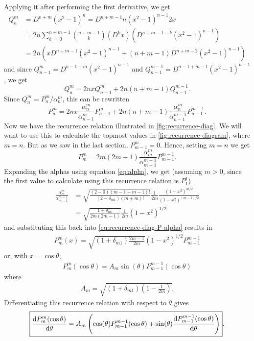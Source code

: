 \documentclass[12pt]{article}
\begin{document}
Applying it after performing the first derivative, we get
\begin{align}
  Q_n^m &= D^{n+m}(x^2 - 1)^n = D^{n + m - 1}n(x^2 - 1)^{n-1}2x\\ 
  &= 2n\sum_{k\,=\,0}^{n+m-1}{n+m-1\choose k}\left(D^k x\right)\left(D^{n+m-1-k}(x^2 - 1)^{n-1}\right)\\ 
  &= 2n\left(xD^{n+m-1}(x^2 - 1)^{n-1} + (n+m-1)D^{n+m-2}(x^2-1)^{n-1}\right)
\end{align}
and since $Q_{n-1}^{m} = D^{n-1+m}(x^2-1)^{n-1}$ and $Q_{n-1}^{m-1}=D^{n-1+m-1}(x^2-1)^{n-1}$, we get
\begin{equation}\label{eq:recurrence-diag-Q}
  Q_n^m = 2nxQ_{n-1}^m + 2n(n+m-1)Q_{n-1}^{m-1}.
\end{equation}
Since $Q_n^m=P_n^m/\alpha_n^m$, this can be rewritten
\begin{equation}
  P_n^m = 2nx\frac{\alpha_n^m}{\alpha_{n-1}^m}P_{n-1}^m + 2n(n+m-1)\frac{\alpha_n^m}{\alpha_{n-1}^{m-1}}P_{n-1}^{m-1}.
\end{equation}
Now we have the recurrence relation illustrated in \autoref{fig:recurrence-diag}. We will want to use this to calculate the topmost values in \autoref{fig:recurrence-diagram}, where $m=n$. But as we saw in the last section, $P_{m-1}^m = 0$. Hence, setting $m = n$ we get 
\begin{equation}\label{eq:recurrence-diag-P-alpha}
  P_m^m = 2m(2m-1)\frac{\alpha_m^m}{\alpha_{m-1}^{m-1}}P_{m-1}^{m-1}.
\end{equation}
Expanding the alphas using equation \eqref{eq:alpha}, we get (assuming $m>0$, since the first value to calculate using this recurrence relation is $P_1^1$)
\begin{align}
  \frac{\alpha_m^m}{\alpha_{m-1}^{m-1}} &= \sqrt{\frac{(2-0)(m-1+m-1)!}{(2-\delta_{m1})(m+m)!}}\frac{1}{2m}\frac{(1-x^2)^{m/2}}{(1-x^2)^{(m-1)/2}}\\ 
                                        &= \sqrt{\frac{1+\delta_{m1}}{2m(2m-1)}}\frac{1}{2m}(1-x^2)^{1/2}
\end{align}
and substituting this back into \eqref{eq:recurrence-diag-P-alpha} results in
\begin{align}
  P_m^m(x) = \sqrt{(1+\delta_{m1})\frac{2m-1}{2m}}(1-x^2)^{1/2}P_{m-1}^{m-1}
\end{align}
or, with $x=\cos\theta$,
\begin{align}
  \boxed{P_m^m(\cos\theta) = A_m\sin(\theta) P_{m-1}^{m-1}(\cos\theta)}
\end{align}
where 
\begin{align}
  \boxed{A_m = \sqrt{(1+\delta_{m1})\left(1-\frac{1}{2m}\right)}}.
\end{align}
Differentiating this recurrence relation with respect to $\theta$ gives
\begin{align}
  \boxed{\derivative{P_m^m(\cos\theta)}{\theta} = A_m\left(\cos(\theta)P_{m-1}^{m-1}(\cos\theta) + \sin(\theta)\derivative{P_{m-1}^{m-1}(\cos\theta)}{\theta}\right)}.
\end{align}
\end{document}
